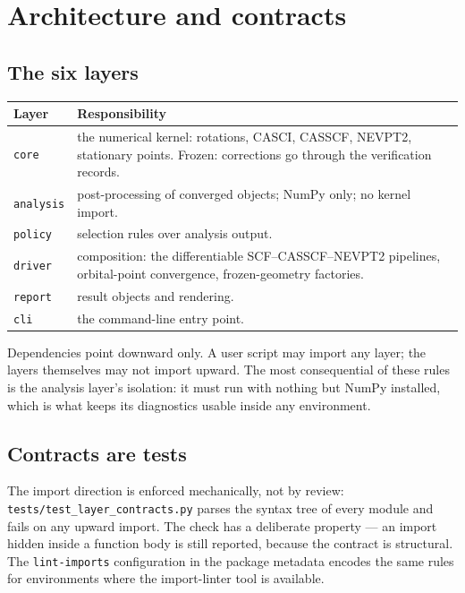 \chapter{Architecture and contracts}
\label{ch:architecture}

\section{The six layers}

\begin{center}
\begin{tabularx}{\textwidth}{lX}
\toprule
Layer & Responsibility \\
\midrule
\texttt{core} & the numerical kernel: rotations, CASCI, CASSCF,
  NEVPT2, stationary points.  Frozen: corrections go through the
  verification records. \\
\texttt{analysis} & post-processing of converged objects; NumPy only;
  no kernel import. \\
\texttt{policy} & selection rules over analysis output. \\
\texttt{driver} & composition: the differentiable SCF--CASSCF--NEVPT2
  pipelines, orbital-point convergence, frozen-geometry factories. \\
\texttt{report} & result objects and rendering. \\
\texttt{cli} & the command-line entry point. \\
\bottomrule
\end{tabularx}
\end{center}

Dependencies point downward only.  A user script may import any layer;
the layers themselves may not import upward.  The most consequential
of these rules is the analysis layer's isolation: it must run with
nothing but NumPy installed, which is what keeps its diagnostics
usable inside any environment.

\section{Contracts are tests}

The import direction is enforced mechanically, not by review:
\texttt{tests/test\_layer\_contracts.py} parses the syntax tree of
every module and fails on any upward import.  The check has a
deliberate property --- an import hidden inside a function body is
still reported, because the contract is structural.  The
\texttt{lint-imports} configuration in the package metadata encodes
the same rules for environments where the import-linter tool is
available.

